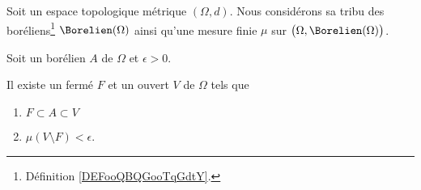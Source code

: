 \begin{lemma}       \label{LEMooCGKXooYWjRwk}
	Soit un espace topologique métrique \( (\Omega,d)\). Nous considérons sa tribu des boréliens\footnote{Définition \ref{DEFooQBQGooTqGdtY}.} \( \Borelien(\Omega)\) ainsi qu'une mesure finie \( \mu\) sur \( \big(\Omega,\Borelien(\Omega)\big)\).

	Soit un borélien \( A\) de \( \Omega\) et \( \epsilon>0\).

	Il existe un fermé \( F\) et un ouvert \( V\) de \( \Omega\) tels que
	\begin{enumerate}
		\item
		      \( F\subset A\subset V\)
		\item
		      \( \mu(V\setminus F)<\epsilon\).
	\end{enumerate}
\end{lemma}

